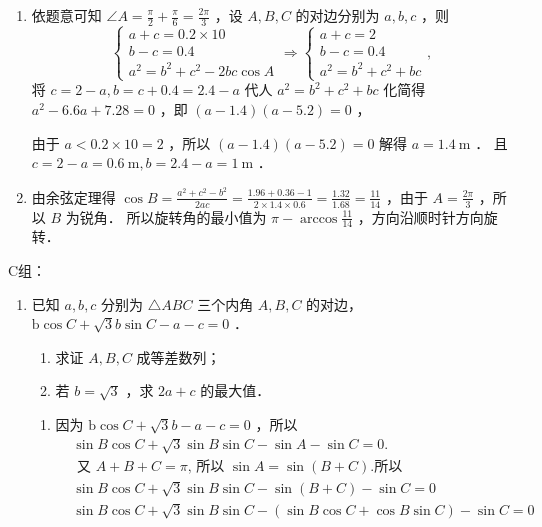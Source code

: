 \begin{enumerate}
\begin{enumerate}[(1)]
\begin{jieda}
    \begin{enumerate}[(1)]
\item 依题意可知 $\angle A=\frac{\pi}{2}+\frac{\pi}{6}=\frac{2 \pi}{3}$ ，设 $A, B, C$ 的对边分别为 $a, b, c$ ，则
$$
\left\{\begin{array} { l } 
{ a + c = 0 . 2 \times 1 0 } \\
{ b - c = 0 . 4 } \\
{ a ^ { 2 } = b ^ { 2 } + c ^ { 2 } - 2 b c \operatorname { c o s } A }
\end{array} \Rightarrow \left\{\begin{array}{l}
a+c=2 \\
b-c=0.4 \\
a^2=b^2+c^2+b c
\end{array},\right.\right.
$$
将 $c=2-a, b=c+0.4=2.4-a$ 代人 $a^2=b^2+c^2+b c$ 化简得 $a^2-6.6 a+7.28=0$ ，即 $(a-1.4)(a-5.2)=0$ ，

由于 $a<0.2 \times 10=2$ ，所以 $(a-1.4)(a-5.2)=0$ 解得 $a=1.4 \mathrm{~m}$ ．
且 $c=2-a=0.6 \mathrm{~m}, b=2.4-a=1 \mathrm{~m}$ ．
\item 由余弦定理得 $\cos B=\frac{a^2+c^2-b^2}{2 a c}=\frac{1.96+0.36-1}{2 \times 1.4 \times 0.6}=\frac{1.32}{1.68}=\frac{11}{14}$ ，由于 $A=\frac{2 \pi}{3}$ ，所以 $B$ 为锐角．
所以旋转角的最小值为 $\pi-\arccos \frac{11}{14}$ ，方向沿顺时针方向旋转．
    \end{enumerate}
\end{jieda}
\end{enumerate}

C组：
\begin{enumerate}
    \item 已知 $a, b, c$ 分别为 $\triangle A B C$ 三个内角 $A, B, C$ 的对边， $\mathrm{b} \cos C+\sqrt{3} b \sin C-a-c=0$ ．
    \begin{enumerate}[(1)]
        \item 求证 $A, B, C$ 成等差数列；
        \item 若 $b=\sqrt{3}$ ，求 $2 a+c$ 的最大值．
    \end{enumerate}
\begin{jieda}
    \begin{enumerate}[(1)]
        \item 因为 $\mathrm{b} \cos C+\sqrt{3} b-a-c=0$ ，所以
$$
\begin{aligned}
& \sin B \cos C+\sqrt{3} \sin B \sin C-\sin A-\sin C=0 . \\
& \text { 又 } A+B+C=\pi \text {, 所以 } \sin A=\sin (B+C) \text {.所以 } \\
& \sin B \cos C+\sqrt{3} \sin B \sin C-\sin (B+C)-\sin C=0 \\
& \sin B \cos C+\sqrt{3} \sin B \sin C-(\sin B \cos C+\cos B \sin C)-\sin C=0
\end{aligned}
$$


\end{enumerate}
\end{jieda}
\end{enumerate}
\end{enumerate}
